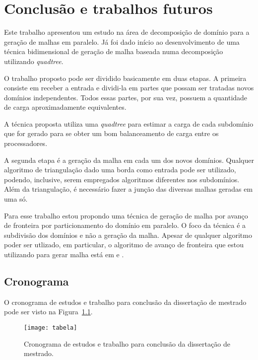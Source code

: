 \pagestyle{empty}
\cleardoublepage
\pagestyle{fancy}
\chapter{Conclusão e trabalhos futuros}\label{cap4}

Este trabalho apresentou um estudo na área de decomposição de domínio para a geração de malhas em paralelo. Já foi dado início ao desenvolvimento de uma técnica bidimensional de geração de malha baseada numa decomposição utilizando \textit{quadtree}.

O trabalho proposto pode ser dividido basicamente em duas etapas. A primeira consiste em receber a entrada e dividi-la em partes que possam ser tratadas novos domínios independentes. Todos essas partes, por sua vez, possuem a quantidade de carga aproximadamente equivalentes.

A técnica proposta utiliza uma \textit{quadtree} para estimar a carga de cada subdomínio que for gerado para se obter um bom balanceamento de carga entre os processadores.

A segunda etapa é a geração da malha em cada um dos novos domínios. Qualquer algoritmo de triangulação dado uma borda como entrada pode ser utilizado, podendo, inclusive, serem empregados algoritmos diferentes nos subdomínios. Além da triangulação, é necessário fazer a junção das diversas malhas geradas em uma só.

Para esse trabalho estou propondo uma técnica de geração de malha por avanço de fronteira por particionamento do domínio em paralelo. O foco da técnica é a subdivisão dos domínios e não a geração da malha. Apesar de qualquer algoritmo poder ser utlizado, em particular, o algoritmo de avanço de fronteira que estou utilizando para gerar malha está em \cite{bib:Miranda99} e \cite{bib:Cavalcante-Neto01}.

\section{Cronograma}
O cronograma de estudos e trabalho para conclusão da dissertação de mestrado pode ser visto na Figura~\ref{fig:tabela}.

 \begin{figure}[htbp]
     \begin{center}
     \texttt{[image: tabela]}
     \caption{Cronograma de estudos e trabalho para conclusão da dissertação de mestrado.} 
     \label{fig:tabela}
     \end{center}
 \end{figure}